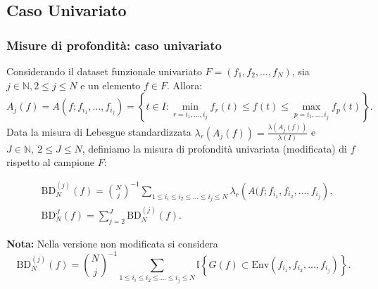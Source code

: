 \documentclass[9pt]{beamer}
\begin{document}
\subsection{Caso Univariato}
\begin{frame}
\frametitle{Misure di profondit\`a: caso univariato}
Considerando il dataset funzionale univariato $ F = \left( f_1, f_2, \ldots, f_N\right)$,
sia $j \in \mathbb{N}, 2 \leq j \leq N$ e un elemento $f \in F$. Allora:
\[
  A_j \left( f \right) = A \left( f; f_{i_1}, \ldots, f_{i_j} \right) = \left\{ t \in I : \min_{r=i_1,\ldots,i_j} f_r(t) \leq f(t) \leq \max_{p=i_1,\ldots,i_j} f_p(t) \right\}.
 \]
Data la misura di Lebesgue standardizzata $\lambda_r \left( A_j(f) \right) = \frac{\lambda \left( A_j(f) \right) }{\lambda(I)}$
e $J \in \mathbb{N},\ 2 \leq J \leq N$, definiamo la misura di profondit\`a univariata (modificata) di $f$ rispetto al campione $F$:

\begin{align*}
 & \text{BD}^{(j)}_N(f) = {N \choose j}^{-1} \sum_{1 \leq i_i \leq i_2 \leq \ldots \leq i_j \leq N } \lambda_r \left( A(f; f_{i_1}, f_{i_2}, \ldots, f_{i_j} \right),\\
 & \text{BD}^J_N\left( f \right) = \sum_{j=2}^J \text{BD}^{(j)}_N\left(f\right).
\end{align*}

\textbf{Nota:} Nella versione non modificata si considera 
\[
\text{BD}^{(j)}_N(f) = {N \choose j}^{-1} \sum_{1 \leq i_i \leq i_2 \leq \ldots \leq i_j \leq N } \mathbb{I}  \left\{ G(f) \subset \text{Env}(f_{i_1}, f_{i_2},\ldots, f_{i_j})\right\}.                                                          
\]

\end{frame}

\end{document}
